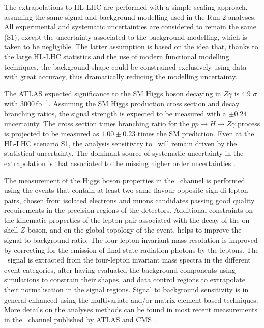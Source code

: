 The extrapolations to HL-LHC are performed with a simple scaling approach, assuming the same signal and background modelling used in the Run-2 analyses. All experimental and systematic uncertainties are considered to remain the same (S1), except the uncertainty associated to the background modelling, which is taken to be negligible. The latter assumption is based on the idea that, thanks to the large HL-LHC statistics and the use of modern functional modelling techniques, the background shape could be constrained exclusively using data with great accuracy, thus dramatically reducing the modelling uncertainty.

The ATLAS expected significance to the SM Higgs boson decaying in $Z\gamma$ is 4.9 $\sigma$ with 3000\,$\mathrm{fb}^{-1}$. Assuming the SM Higgs production cross section and decay branching ratios, the signal strength is expected to be measured with a $\pm0.24$ uncertainty. The cross section times branching ratio for the $pp\rightarrow H \rightarrow Z\gamma$ process is projected to be measured as $1.00\pm0.23$ times the SM prediction. Even at the HL-LHC scenario S1, the analysis sensitivity  to \HZy\ will remain driven by the statistical uncertainty. The dominant source of systematic uncertainty in the extrapolation is that associated to the 
missing higher order uncertainties \cite{ATL-PHYS-PUB-2018-054}.


The measurement of the Higgs boson properties in the \HZZ\ channel is performed using the events that contain at least two same-flavour opposite-sign di-lepton pairs, chosen from isolated electrons and muons candidates passing good quality requirements in the precision regions of the detectors. Additional constraints on the kinematic properties of the lepton pair associated with the decay of the on-shell $Z$ boson, and on the global topology of the event, helps to improve the signal to background ratio. The four-lepton invariant mass resolution is improved by correcting for the emission of final-state radiation photons by the leptons.
The \HZZ\ signal is extracted from the four-lepton invariant mass spectra in the different event categories, after having evaluated the background components using simulations to constrain their shapes, and data control regions to extrapolate their normalisation in the signal regions. Signal to background sensitivity is in general enhanced using the multivariate and/or matrix-element based techniques. More details on the analyses methods can be found in most recent measurements in the \HZZ\ channel published by ATLAS \cite{ATLAS:2018bsg} and CMS \cite{Sirunyan:2017exp}.

